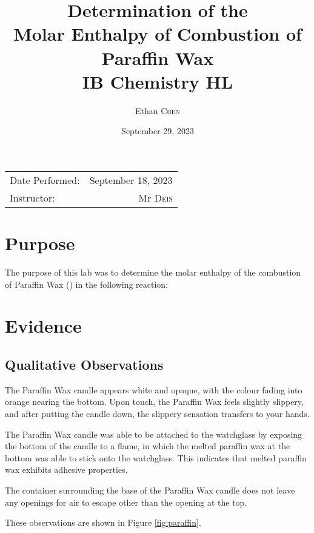 \documentclass[
	letterpaper, %
	12pt, %
]{CSUniSchoolLabReport}
\title{Determination of the \\ Molar Enthalpy of Combustion of Paraffin Wax \\ IB Chemistry HL} %
\author{Ethan \textsc{Chen}} %
\date{September 29, 2023} %
\begin{document}
\maketitle %

\begin{center}
  \begin{tabular}{l r}
    Date Performed: & September 18, 2023 \\ %
    Instructor:     & Mr \textsc{Deis}   %
  \end{tabular}
\end{center}



\section{Purpose}

\par The purpose of this lab was to determine the molar enthalpy of the combustion of Paraffin Wax () in the following reaction:

\begin{center}
\end{center}


\section{Evidence}

\subsection{Qualitative Observations}

The Paraffin Wax candle appears white and opaque, with the colour fading into orange nearing the bottom.
Upon touch, the Paraffin Wax feels slightly slippery, and after putting the candle down, the slippery sensation
transfers to your hands.
\\
\par The Paraffin Wax candle was able to be attached to the watchglass by exposing the
bottom of the candle to a flame, in which the melted paraffin wax at the bottom
was able to stick onto the watchglass. This indicates that melted paraffin wax exhibits
adhesive properties.
\\
\par The container surrounding the base of the Paraffin Wax candle does not leave
any openings for air to escape other than the opening at the top.
\\
\par These observations are shown in Figure \ref*{fig:paraffin}.
\end{document}
